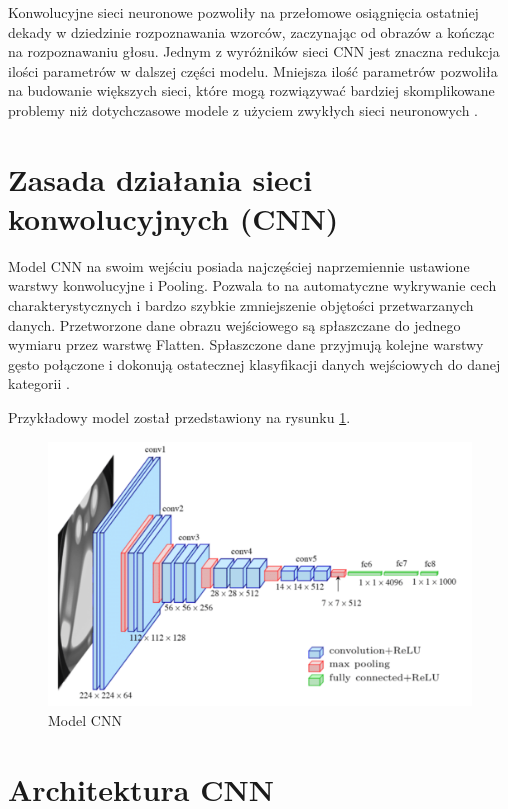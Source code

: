 \documentclass[a4paper,12pt,oneside]{book} %
\begin{document}
Konwolucyjne sieci neuronowe pozwoliły na przełomowe osiągnięcia ostatniej dekady w dziedzinie rozpoznawania wzorców, zaczynając od obrazów a kończąc na rozpoznawaniu głosu. Jednym z wyróżników sieci CNN jest znaczna redukcja ilości parametrów w dalszej części modelu. Mniejsza ilość parametrów pozwoliła na budowanie większych sieci, które mogą rozwiązywać bardziej skomplikowane problemy niż dotychczasowe modele z użyciem zwykłych sieci neuronowych \cite{8308186}.

\section{Zasada działania sieci konwolucyjnych (CNN)}

Model CNN na swoim wejściu posiada najczęściej naprzemiennie ustawione warstwy konwolucyjne i Pooling. Pozwala to na automatyczne wykrywanie cech charakterystycznych i bardzo szybkie zmniejszenie objętości przetwarzanych danych. Przetworzone dane obrazu wejściowego są spłaszczane do jednego wymiaru przez warstwę Flatten. Spłaszczone dane przyjmują kolejne warstwy gęsto połączone i dokonują ostatecznej klasyfikacji danych wejściowych do danej kategorii \cite{9463236}.

Przykładowy model został przedstawiony na rysunku \ref{cnn_mod}.

\begin{figure}[h]
	\centering
	\includegraphics[scale=0.55]{cnn_arch.png}
	\caption{Model CNN \cite{cnnarch}}
	\label{cnn_mod}
\end{figure}

\section{Architektura CNN}
\end{document}
